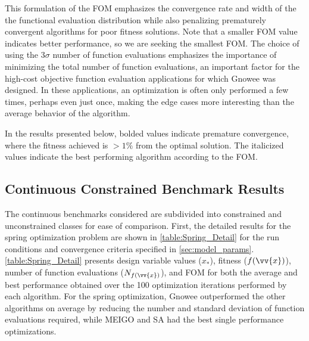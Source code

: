 \documentclass{article}                                                                           %
\begin{document}
This formulation of the FOM emphasizes the convergence rate and width of the the functional evaluation distribution while also penalizing prematurely convergent algorithms for poor fitness solutions.  
Note that a smaller FOM value indicates better performance, so we are seeking the smallest FOM.
The choice of using the $3\sigma$ number of function evaluations emphasizes the importance of minimizing the total number of function evaluations, an important factor for the high-cost objective function evaluation applications for which Gnowee was designed.  
In these applications, an optimization is often only performed a few times, perhaps even just once, making the edge cases more interesting than the average behavior of the algorithm.    

In the results presented below, bolded values indicate premature convergence, where the fitness achieved is $> 1\%$ from the optimal solution.
The italicized values indicate the best performing algorithm according to the FOM.

\subsection{Continuous Constrained Benchmark Results} \label{sec:con_con_results}
The continuous benchmarks considered are subdivided into constrained and unconstrained classes for ease of comparison.  First, the detailed results for the spring optimization problem are shown in \autoref{table:Spring_Detail} for the run conditions and convergence criteria specified in \autoref{sec:model_params}.
\autoref{table:Spring_Detail} presents design variable values ($x_*$), fitness ($f(\vv{x})$), number of function evaluations ($N_{f(\vv{x})}$), and FOM for both the average and best performance obtained over the 100 optimization iterations performed by each algorithm. 
For the spring optimization, Gnowee outperformed the other algorithms on average by reducing the number and standard deviation of function evaluations required, while MEIGO and SA had the best single performance optimizations.    
\end{document}
